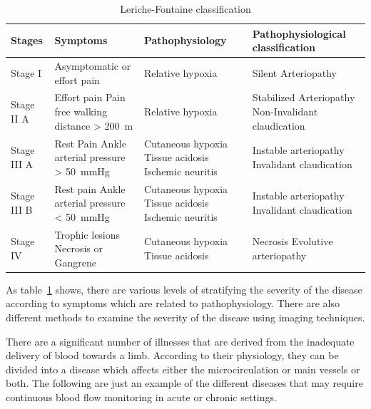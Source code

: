 \begin{table}
\caption{Leriche-Fontaine classification}
\centering
\label{table:Fontaine}
\begin{tabular}{p{1.8cm} >{\raggedright}p{3.6cm} p{3.4cm} p{4.8cm}}
\toprule
\textbf{Stages}& \textbf{Symptoms} & \textbf{Pathophysiology} & \textbf{Pathophysiological \newline classification} \\
\midrule
Stage I & Asymptomatic or effort pain & Relative hypoxia & Silent Arteriopathy \\
\midrule
Stage II A & Effort pain \newline Pain free walking distance > \SI{200}{\meter} & Relative hypoxia & Stabilized Arteriopathy \newline Non-Invalidant claudication \\ 
\midrule
Stage III A & Rest Pain \newline Ankle arterial pressure > \SI{50}{\mmHg} & Cutaneous hypoxia \newline Tissue acidosis \newline Ischemic neuritis & Instable arteriopathy \newline Invalidant claudication \\
\midrule
Stage III B & Rest pain \newline Ankle arterial pressure < \SI{50}{\mmHg} & Cutaneous hypoxia \newline Tissue acidosis \newline Ischemic neuritis & Instable arteriopathy \newline
Invalidant claudication \\
\midrule
Stage IV & Trophic lesions \newline Necrosis or Gangrene & Cutaneous hypoxia \newline 
Tissue acidosis & Necrosis \newline Evolutive arteriopathy \\
\bottomrule
\end{tabular}
\end{table}

As table~\ref{table:Fontaine} shows, there are various levels of stratifying the severity of the disease according to symptoms which are related to pathophysiology. There are also different methods to examine the severity of the disease using imaging techniques.

There are a significant number of illnesses that are derived from the inadequate delivery of blood towards a limb. According to their physiology, they can be divided into a disease which affects either the microcirculation or main vessels or both. The following are just an example of the different diseases that may require continuous blood flow monitoring in acute or chronic settings.



